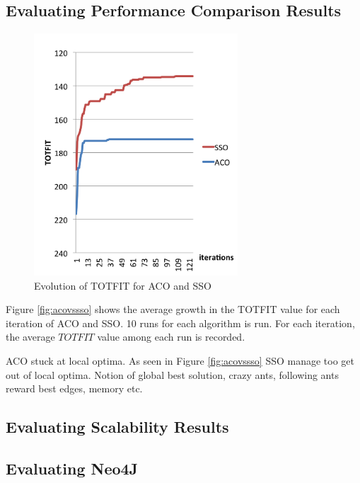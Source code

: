\subsection{Evaluating Performance Comparison Results}

 \begin{figure}[H]
    \begin{center}
    \includegraphics[width=3in]{assets/acovsssoNEW.png}
    \end{center}
    \caption{Evolution of TOTFIT for ACO and SSO }
    \label{fig:acovssso} 
    \end{figure}

Figure \vref{fig:acovssso} shows the average growth in the TOTFIT value for each iteration of ACO and SSO. 10 runs for each algorithm is run. For each iteration, the average $TOTFIT$ value among each run is recorded. 

ACO stuck at local optima. As seen in Figure \vref{fig:acovssso} SSO manage too get out of local optima. Notion of global best solution, crazy ants, following ants reward best edges, memory etc.

\subsection{Evaluating Scalability Results}
\subsection{Evaluating Neo4J}


